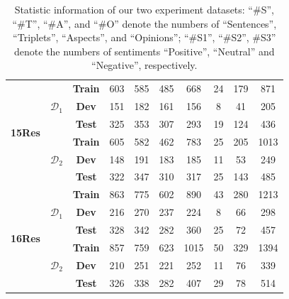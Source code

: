 \documentclass[11pt]{article}
\begin{document}
\begin{table}
{\begin{tabular}{cccccccccc}
    \multirow{6}[4]{*}{\textbf{15Res}} & \multirow{3}[2]{*}{$\mathcal{D}_1$} & \textbf{Train} & 603   & 585   & 485   & 668   & 24    & 179   & 871 \\
          &       & \textbf{Dev} & 151   & 182   & 161   & 156   & 8     & 41    & 205 \\
          &       & \textbf{Test} & 325   & 353   & 307   & 293   & 19    & 124   & 436 \\
\cmidrule{2-10}          & \multirow{3}[2]{*}{$\mathcal{D}_2$} & \textbf{Train} & 605   & 582   & 462   & 783   & 25    & 205   & 1013 \\
          &       & \textbf{Dev} & 148   & 191   & 183   & 185   & 11    & 53    & 249 \\
          &       & \textbf{Test} & 322   & 347   & 310   & 317   & 25    & 143   & 485 \\
    \midrule
    \multirow{6}[4]{*}{\textbf{16Res}} & \multirow{3}[2]{*}{$\mathcal{D}_1$} & \textbf{Train} & 863   & 775   & 602   & 890   & 43    & 280   & 1213 \\
          &       & \textbf{Dev} & 216   & 270   & 237   & 224   & 8     & 66    & 298 \\
          &       & \textbf{Test} & 328   & 342   & 282   & 360   & 25    & 72    & 457 \\
\cmidrule{2-10}          & \multirow{3}[2]{*}{$\mathcal{D}_2$} & \textbf{Train} & 857   & 759   & 623   & 1015  & 50    & 329   & 1394 \\
          &       & \textbf{Dev} & 210   & 251   & 221   & 252   & 11    & 76    & 339 \\
          &       & \textbf{Test} & 326   & 338   & 282   & 407   & 29    & 78    & 514 \\
    \bottomrule
    \hline
    \end{tabular}%
    
    }
  \caption{Statistic information of our two experiment datasets: 
  ``\#S'', ``\#T'', ``\#A'', and ``\#O'' denote the numbers of ``Sentences'', ``Triplets'', ``Aspects'', and ``Opinions''; ``\#S1'', ``\#S2'', \#S3'' denote the numbers of sentiments ``Positive'', ``Neutral'' and ``Negative'', respectively.}
  \label{tab:data}%
\end{table}%



\end{document}

